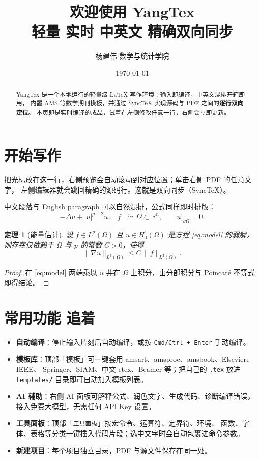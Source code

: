 \documentclass[11pt,a4paper,fontset=fandol]{ctexart}
\title{\textbf{欢迎使用 YangTex}\\[4pt]
       \large 轻量 \quad 实时 \quad 中英文 \quad 精确双向同步}
\author{杨建伟 \quad 数学与统计学院}
\date{\today}
\newtheorem{theorem}{定理}[section]
\newcommand{\R}{\mathbb{R}}
\newcommand{\Om}{\Omega}
\begin{document}
\maketitle

\begin{abstract}
\noindent YangTex 是一个本地运行的轻量级 \LaTeX{} 写作环境：输入即编译，中英文混排开箱即用，
内置 AMS 等数学期刊模板，并通过 SyncTeX 实现源码与 PDF 之间的\textbf{逐行双向定位}。
本页即是实时编译的成品，试着在左侧修改任意一行，右侧会立即更新。
\end{abstract}

\section{开始写作}

把光标放在这一行，右侧预览会自动滚动到对应位置；单击右侧 PDF 的任意文字，
左侧编辑器就会跳回精确的源码行。这就是双向同步（SyncTeX）。

中文段落与 English paragraph 可以自然混排，公式同样即时排版：
\begin{equation}\label{eq:model}
  -\Delta u + |u|^{p-2}u = f \quad \text{in } \Om\subset\R^n,
  \qquad u|_{\partial\Om}=0 .
\end{equation}

\begin{theorem}[能量估计]
设 $f\in L^2(\Om)$ 且 $u\in H^1_0(\Om)$ 是方程 \eqref{eq:model} 的弱解，
则存在仅依赖于 $\Om$ 与 $p$ 的常数 $C>0$，使得
\begin{equation}
  \|\nabla u\|_{L^2(\Om)} \le C\,\|f\|_{L^2(\Om)} .
\end{equation}
\end{theorem}

\begin{proof}
在 \eqref{eq:model} 两端乘以 $u$ 并在 $\Om$ 上积分，由分部积分与
Poincaré 不等式即得结论。
\end{proof}

\section{常用功能  追着}
\begin{itemize}
  \item \textbf{自动编译}：停止输入片刻后自动编译，或按 \texttt{Cmd/Ctrl + Enter} 手动编译。
  \item \textbf{模板库}：顶部「模板」可一键套用 amsart、amsproc、amsbook、Elsevier、IEEE、
        Springer、SIAM、中文 ctex、Beamer 等；把自己的 \texttt{.tex} 放进 \texttt{templates/}
        目录即可自动加入模板列表。
  \item \textbf{AI 辅助}：右侧 AI 面板可解释公式、润色文字、生成代码、诊断编译错误，
        接入免费大模型，无需任何 API Key 设置。
  \item \textbf{工具面板}：顶部「\texttt{工具面板}」按宏命令、运算符、定界符、环境、
        函数、字体、表格等分类一键插入代码片段；选中文字时会自动包裹进命令参数。
  \item \textbf{新建项目}：每个项目独立目录，PDF 与源文件保存在同一处。
\end{itemize}
\end{document}
